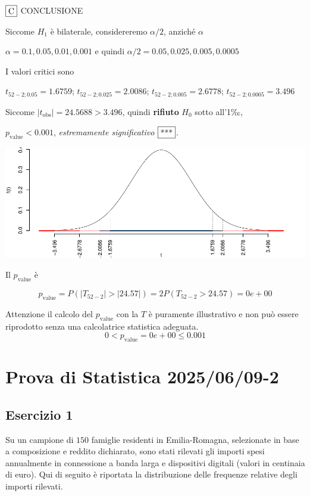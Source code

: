 \documentclass[
  11pt,
]{book}
\theoremstyle{mytheoremstyle}
\theoremstyle{mydefstyle}
\begin{document}
\(\fbox{C}\) CONCLUSIONE

Siccome \(H_1\) è bilaterale, considereremo \(\alpha/2\),
anziché \(\alpha\)

\(\alpha=0.1, 0.05, 0.01, 0.001\) e quindi \(\alpha/2=0.05, 0.025, 0.005, 0.0005\)

I valori critici sono

\(t_{52-2;0.05}=1.6759\); \(t_{52-2;0.025}=2.0086\); \(t_{52-2;0.005}=2.6778\); \(t_{52-2;0.0005}=3.496\)

Siccome \(|t_\text{obs}|=24.5688>3.496\), quindi \textbf{rifiuto} \(H_0\) sotto all'1‰,

\(p_\text{value}<0.001\), \emph{estremamente significativo} \(\fbox{***}\).

\begin{center}\includegraphics{Esami_passati_con_soluzioni_files/figure-latex/unnamed-chunk-33-1} \end{center}

Il \(p_{\text{value}}\) è

\[ p_{\text{value}} = P(|T_{52-2}|>|24.57|)=2P(T_{52-2}>24.57)=0e+00 \]

Attenzione il calcolo del \(p_\text{value}\) con la \(T\) è puramente illustrativo e non può essere riprodotto senza una calcolatrice statistica adeguata.\[
 0 < p_\text{value}= 0e+00 \leq 0.001 
\]

\section{Prova di Statistica 2025/06/09-2}\label{prova-di-statistica-20250609-2}

\subsection{Esercizio 1}\label{esercizio-1-44}

Su un campione di \(150\) famiglie residenti in Emilia-Romagna, selezionate in base a composizione e reddito dichiarato, sono stati rilevati gli importi spesi annualmente in connessione a banda larga e dispositivi digitali (valori in centinaia di euro). Qui di seguito è riportata la distribuzione delle frequenze relative degli importi rilevati.
\end{document}
